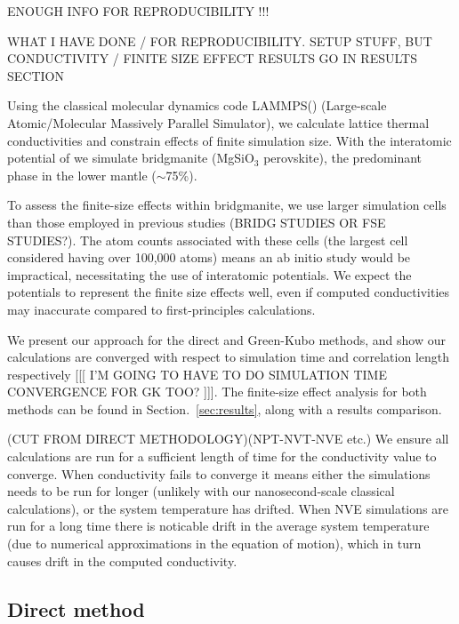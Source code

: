 \documentclass[%
preprint,                                  %
nofootinbib,
 amsmath,amssymb,
 aps,
]{revtex4-1}
\begin{document}
ENOUGH INFO FOR REPRODUCIBILITY !!!

WHAT I HAVE DONE / FOR REPRODUCIBILITY. SETUP STUFF, BUT CONDUCTIVITY / FINITE SIZE EFFECT RESULTS GO IN RESULTS SECTION


Using the classical molecular dynamics code LAMMPS(\citet{Plimpton1995}) (Large-scale Atomic/Molecular Massively Parallel Simulator), we calculate lattice thermal conductivities and constrain effects of finite simulation size. With the interatomic potential of \citet{Oganov2000} we simulate bridgmanite (MgSiO$_3$ perovskite), the predominant phase in the lower mantle ($\sim$75\%). 

To assess the finite-size effects within bridgmanite, we use larger simulation cells than those employed in previous studies (BRIDG STUDIES OR FSE STUDIES?). The atom counts associated with these cells (the largest cell considered having over 100,000 atoms) means an ab initio study would be impractical, necessitating the use of interatomic potentials. We expect the potentials to represent the finite size effects well, even if computed conductivities may inaccurate compared to first-principles calculations. 

We present our approach for the direct and Green-Kubo methods, and show our calculations are converged with respect to simulation time and correlation length respectively [[[ I'M GOING TO HAVE TO DO SIMULATION TIME CONVERGENCE FOR GK TOO? ]]]. The finite-size effect analysis for both methods can be found in Section.~\ref{sec:results}, along with a results comparison.


(CUT FROM DIRECT METHODOLOGY)(NPT-NVT-NVE etc.) We ensure all calculations are run for a sufficient length of time for the conductivity value to converge. When conductivity fails to converge it means either the simulations needs to be run for longer (unlikely with our nanosecond-scale classical calculations), or the system temperature has drifted. When NVE simulations are run for a long time there is noticable drift in the average system temperature (due to  numerical approximations in the equation of motion), which in turn causes drift in the computed conductivity.




\subsection{\label{sec:method.direct}Direct method}
\end{document}
